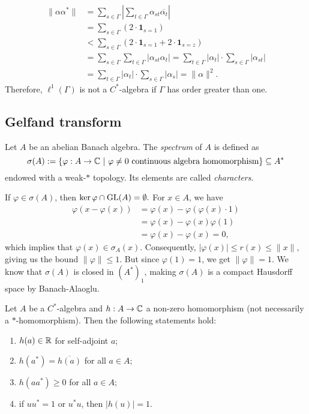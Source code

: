 \begin{example}
\begin{align*}
    \|\alpha \alpha^*\| &= \sum_{s \in \Gamma} \left| \sum_{t \in \Gamma} \alpha_{st} \overline{\alpha_{t}} \right|\\
    &= \sum_{s \in \Gamma} (2 \cdot \mathbf{1}_{s = 1})\\
    &< \sum_{s \in \Gamma} (2 \cdot \mathbf{1}_{s = 1} + 2\cdot \mathbf{1}_{s = z} )\\
    &= \sum_{s \in \Gamma} \sum_{t \in \Gamma} \left| \alpha_{st} {\alpha_{t}} \right| = \sum_{t \in \Gamma}|{\alpha_{t}}| \cdot \sum_{s \in \Gamma}  \left| \alpha_{st}  \right|\\
    &= \sum_{t \in \Gamma} \left|  {\alpha_{t}} \right| \cdot \sum_{s \in \Gamma} |\alpha_{s}| = \| \alpha\|^2.
  \end{align*}
  Therefore, $\ell^1 (\Gamma)$ is not a $C^*$-algebra if $\Gamma$ has order greater than one.
\end{example}

\subsection{Gelfand transform}

\begin{definition}
  Let $A$ be an abelian Banach algebra. The \emph{spectrum} of $A$ is defined as
  $$\sigma (A) := \{\varphi: A \to \mathbb {C}\ |\ \textrm{$\varphi \neq 0$ continuous algebra homomorphism}\} \subseteq A^*$$
  endowed with a weak-$*$ topology. Its elements are called \emph{characters}.
\end{definition}

If $\varphi \in \sigma (A)$, then $\ker \varphi \cap \operatorname{GL}(A) = \emptyset.$
For $x \in A$, we have 
\begin{align*}
  \varphi(x - \varphi(x)) &= \varphi(x) - \varphi(\varphi(x) \cdot 1)\\
  &= \varphi(x) - \varphi(x) \varphi(1)\\
  &= \varphi(x) - \varphi(x) = 0,
\end{align*}
which implies that $\varphi(x) \in \sigma_A(x)$.
Consequently, $|\varphi(x)| \leq r(x)\leq \|x\|$, giving us the bound $\|\varphi\| \leq 1$.
But since $\varphi(1) = 1$, we get $\|\varphi\| = 1$.
We know that $\sigma (A)$ is closed in $(A^*)_1$, making $\sigma(A)$ is a compact Hausdorff space by Banach-Alaoglu.

\begin{proposition}
  Let $A$ be a $C^*$-algebra and $h: A \to \mathbb {C}$ a non-zero homomorphism (not necessarily a $*$-homomorphism). 
  Then the following statements hold:
  \begin{enumerate}
    \item $h(a) \in \mathbb {R}$ for self-adjoint $a$;
    \item $h(a^*) = \overline{h(a)}$ for all $a \in A$;
    \item $h(a a^*) \geq 0$ for all $a \in A$;
    \item if $u u^* = 1$ or $u^* u$, then $|h(u)| = 1$. 
  \end{enumerate}
\end{proposition}

